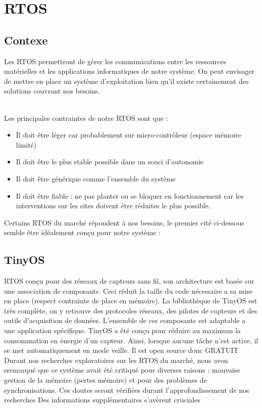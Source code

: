 \section{RTOS}
	\subsection {Contexe}
		Les RTOS permettront de gérer les communications entre les ressources matérielles et les applications informatiques de notre système. On peut envisager de mettre en place un système d'exploitation bien qu'il existe certainement des solutions couvrant nos besoins. \\~
		
		Les principales contraintes de notre RTOS sont que :
		\begin{itemize}
				\item Il doit être léger car probablement sur micro-contrôleur (espace mémoire limité)
				\item Il doit être le plus stable possible dans un souci d'autonomie
				\item Il doit être générique comme l'ensemble du système
				\item Il doit être fiable : ne pas planter ou se bloquer en fonctionnement car les interventions sur les sites doivent être réduites le plus possible.
		\end{itemize}

		Certains RTOS du marché répondent à nos besoins, le premier cité ci-dessous semble être idéalement conçu pour notre système :
		
		\subsection{TinyOS}
		  

{RTOS conçu pour des réseaux de capteurs sans fil, son architecture est basée sur une association de composants.}
{Ceci réduit la taille du code nécessaire a sa mise en place (respect contrainte de place en mémoire). La bibliothèque de TinyOS est très complète, on y retrouve des protocoles réseaux, des pilotes de capteurs et des outils d'acquisition de données. L'ensemble de ces composants est adaptable a une application spécifique.}
{TinyOS a été conçu pour réduire au maximum la consommation en énergie d’un capteur. Ainsi, lorsque aucune tâche n’est active, il se met automatiquement en mode veille.}
{Il est open source donc GRATUIT}
{Durant nos recherches exploratoires sur les RTOS du marché, nous avon sremarqué que ce système avait été critiqué pour diverses raisons : mauvaise
gestion de la mémoire (pertes mémoire) et pour des problèmes de synchronisations. Ces doutes seront vérifiées durant l'approfondissement de nos recherches}
{Des informations supplémentaires s'avèrent cruciales}



